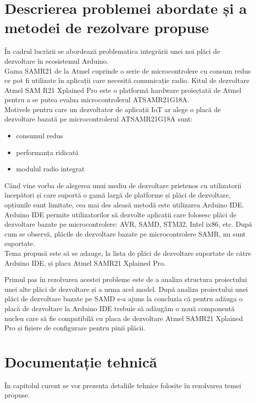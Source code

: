 \documentclass[12pt,a4paper]{report}
\begin{document}
\chapter{Descrierea problemei abordate și a metodei de rezolvare propuse}
În cadrul lucrării se abordează problematica integrării unei noi plăci de dezvoltare în ecosistemul Arduino. \\
Gama SAMR21 de la Atmel cuprinde o serie de microcontrolere cu consum redus ce pot fi utilizate în aplicații care necesită comunicație radio. Kitul de dezvoltare Atmel SAM R21 Xplained Pro este o platformă hardware proiectată de Atmel pentru a se putea evalua microcontrolerul ATSAMR21G18A. \\
Motivele pentru care un dezvoltator de aplicații IoT ar alege o placă de dezvoltare bazată pe microcontrolerul ATSAMR21G18A sunt:
\begin{itemize}
	\item{consumul redus}
	\item{performanța ridicată}
	\item{modulul radio integrat}
\end{itemize}
Când vine vorba de alegerea unui mediu de dezvoltare prietenos cu utilizatorii începători și care suportă o gamă largă de platforme și plăci de dezvoltare, opțiunile sunt limitate, cea mai des aleasă  metodă este utilizarea Arduino IDE. 
Arduino IDE permite utilizatorilor să dezvolte aplicații care folosesc plăci de dezvoltare bazate pe microcontrolere: AVR, SAMD, STM32, Intel ix86, etc. După cum se observă, plăcile de dezvoltare bazate pe microcontrolere SAMR, nu sunt suportate. \\
Tema propusă este să se adauge, la lista de plăci de dezvoltare suportate de către Arduino IDE, și placa Atmel SAMR21 Xplained Pro.

Primul pas în rezolvarea acestei probleme este de a analiza structura proiectului unei alte plăci de dezvoltare și a urma acel model. După analiza proiectului unei plăci de dezvoltare bazate pe SAMD s-a ajuns la concluzia că pentru adăuga o placă de dezvoltare la Arduino IDE trebuie să adăugăm o nouă componentă nucleu care să fie compatibilă cu placa de dezvoltare Atmel SAMR21 Xplained Pro și fișiere de configurare pentru pinii plăcii. 

\chapter{Documentație tehnică}
În capitolul curent se vor prezenta detaliile tehnice folosite în rezolvarea temei propuse.\\
\end{document}

